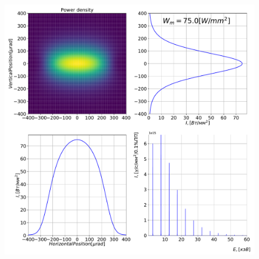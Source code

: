 \documentclass[14pt,a4paper]{extarticle}
\numberwithin{equation}{section}
\begin{document}
		\begin{figure}[htbp]
		\centering  
		\begin{minipage}{1.\textwidth}
			\centering  
			\includegraphics[width=\textwidth]{pic/power_dens.pdf}
			\caption{}
			\label{fig:spec}
		\end{minipage}     
	\end{figure}
	
\end{document}
